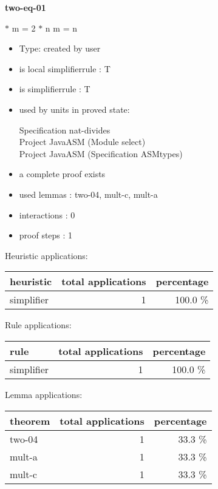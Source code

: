 \documentclass[a4paper]{article}
\begin{document}
\pagebreak

{\LARGE\bf two-eq-01}\label{lemma-two-eq-01}

\medskip

  $*$ m = 2 $*$ n \Equiv m = n

\begin{itemize}

\item Type: created by user

\item is local simplifierrule : T
\item is simplifierrule : T
\item used by units in proved state:

Specification nat-divides \\
Project JavaASM (Module select) \\
Project JavaASM (Specification ASMtypes)
\item       a complete proof exists
\item       used lemmas  : two-04, mult-c, mult-a
\item       interactions : 0
\item       proof steps  : 1
\end{itemize}

\medskip


Heuristic applications:

\begin{supertabular}{l|r|r}
heuristic	& total applications & percentage \\ \hline
simplifier & 1 & 100.0 \% \\

\end{supertabular}

Rule applications:

\begin{supertabular}{l|r|r}
rule	        & total applications & percentage \\ \hline
simplifier & 1 & 100.0 \% \\

\end{supertabular}

Lemma applications:

\begin{supertabular}{l|r|r}
theorem	        & total applications & percentage \\ \hline
two-04 & 1 & 33.3 \% \\
mult-a & 1 & 33.3 \% \\
mult-c & 1 & 33.3 \% \\

\end{supertabular}
\end{document}
